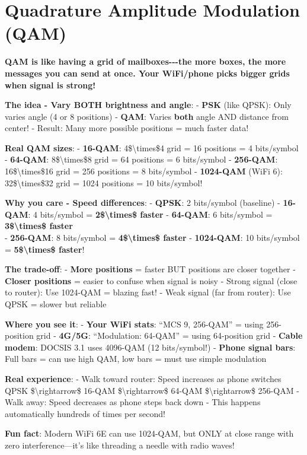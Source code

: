 \chapter{Quadrature Amplitude Modulation (QAM)}
\label{ch:qam}

\begin{nontechnical}

\textbf{QAM is like having a grid of mailboxes-\/-\/-the more boxes, the
more messages you can send at once. Your WiFi/phone picks bigger grids
when signal is strong!}

\textbf{The idea - Vary BOTH brightness and angle}: - \textbf{PSK} (like
QPSK): Only varies angle (4 or 8 positions) - \textbf{QAM}: Varies
\textbf{both} angle AND distance from center! - Result: Many more
possible positions = much faster data!

\textbf{Real QAM sizes}: - \textbf{16-QAM}: 4\$\textbackslash times\$4
grid = 16 positions = 4 bits/symbol - \textbf{64-QAM}:
8\$\textbackslash times\$8 grid = 64 positions = 6 bits/symbol -
\textbf{256-QAM}: 16\$\textbackslash times\$16 grid = 256 positions = 8
bits/symbol - \textbf{1024-QAM} (WiFi 6): 32\$\textbackslash times\$32
grid = 1024 positions = 10 bits/symbol!

\textbf{Why you care - Speed differences}: - \textbf{QPSK}: 2
bits/symbol (baseline) - \textbf{16-QAM}: 4 bits/symbol =
\textbf{2\$\textbackslash times\$ faster} - \textbf{64-QAM}: 6
bits/symbol = \textbf{3\$\textbackslash times\$ faster}\\
- \textbf{256-QAM}: 8 bits/symbol = \textbf{4\$\textbackslash times\$
faster} - \textbf{1024-QAM}: 10 bits/symbol =
\textbf{5\$\textbackslash times\$ faster}!

\textbf{The trade-off}: - \textbf{More positions} = faster BUT positions
are closer together - \textbf{Closer positions} = easier to confuse when
signal is noisy - Strong signal (close to router): Use 1024-QAM =
blazing fast! - Weak signal (far from router): Use QPSK = slower but
reliable

\textbf{Where you see it}: - \textbf{Your WiFi stats}: ``MCS 9,
256-QAM'' = using 256-position grid - \textbf{4G/5G}: ``Modulation:
64-QAM'' = using 64-position grid - \textbf{Cable modem}: DOCSIS 3.1
uses 4096-QAM (12 bits/symbol!) - \textbf{Phone signal bars}: Full bars
= can use high QAM, low bars = must use simple modulation

\textbf{Real experience}: - Walk toward router: Speed increases as phone
switches QPSK \$\textbackslash rightarrow\$ 16-QAM
\$\textbackslash rightarrow\$ 64-QAM \$\textbackslash rightarrow\$
256-QAM - Walk away: Speed decreases as phone steps back down - This
happens automatically hundreds of times per second!

\textbf{Fun fact}: Modern WiFi 6E can use 1024-QAM, but ONLY at close
range with zero interference---it's like threading a needle with radio waves!
\end{nontechnical}

